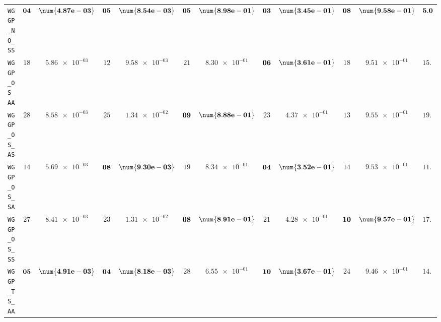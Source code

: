 \begin{xltabular}{\textwidth}{l||cC|cC|cC|cC|cC||c}
	\texttt{WGGP\_NO\_SS} & $\bf 04$ & $\bf \num{4.87e-03}$ & $\bf 05$ & $\bf \num{8.54e-03}$ & $\bf 05$ & $\bf \num{8.98e-01}$ & $\bf 03$ & $\bf \num{3.45e-01}$ & $\bf 08$ & $\bf \num{9.58e-01}$ & $\bf 5.0$  \\
	\texttt{WGGP\_OS\_AA} & $ 18$ & $ \num{5.86e-03}$ & $ 12$ & $ \num{9.58e-03}$ & $ 21$ & $ \num{8.30e-01}$ & $\bf 06$ & $\bf \num{3.61e-01}$ & $ 18$ & $ \num{9.51e-01}$ & $ 15.0$  \\
	\texttt{WGGP\_OS\_AS} & $ 28$ & $ \num{8.58e-03}$ & $ 25$ & $ \num{1.34e-02}$ & $\bf 09$ & $\bf \num{8.88e-01}$ & $ 23$ & $ \num{4.37e-01}$ & $ 13$ & $ \num{9.55e-01}$ & $ 19.6$  \\
	\texttt{WGGP\_OS\_SA} & $ 14$ & $ \num{5.69e-03}$ & $\bf 08$ & $\bf \num{9.30e-03}$ & $ 19$ & $ \num{8.34e-01}$ & $\bf 04$ & $\bf \num{3.52e-01}$ & $ 14$ & $ \num{9.53e-01}$ & $ 11.8$  \\
	\texttt{WGGP\_OS\_SS} & $ 27$ & $ \num{8.41e-03}$ & $ 23$ & $ \num{1.31e-02}$ & $\bf 08$ & $\bf \num{8.91e-01}$ & $ 21$ & $ \num{4.28e-01}$ & $\bf 10$ & $\bf \num{9.57e-01}$ & $ 17.8$  \\
	\texttt{WGGP\_TS\_AA} & $\bf 05$ & $\bf \num{4.91e-03}$ & $\bf 04$ & $\bf \num{8.18e-03}$ & $ 28$ & $ \num{6.55e-01}$ & $\bf 10$ & $\bf \num{3.67e-01}$ & $ 24$ & $ \num{9.46e-01}$ & $ 14.2$  \\

\end{xltabular}
